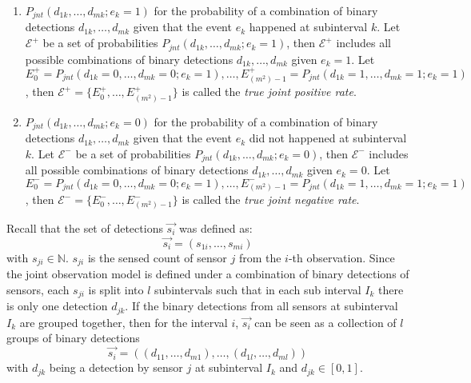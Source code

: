 \begin{enumerate}
    \item $P_{jnt}(d_{1k}, \ldots, d_{mk} ; e_k = 1)$ for the probability of a combination of binary detections $d_{1k}, \ldots, d_{mk}$ given that the event $e_k$ happened at subinterval $k$. Let $\mathcal E^+$ be a set of probabilities $P_{jnt}(d_{1k}, \ldots, d_{mk} ; e_k = 1)$, then $\mathcal E^+$ includes all possible combinations of binary detections $d_{1k}, \ldots, d_{mk}$ given $e_k = 1$. Let $E^+_0 = P_{jnt}(d_{1k} = 0, \ldots, d_{mk} = 0 ; e_k = 1), \ldots, E^+_{(m^2)-1} = P_{jnt}(d_{1k} = 1, \ldots, d_{mk} = 1 ; e_k = 1)$, then $\mathcal E^+ = \big \{ E^+_0, \ldots, E^+_{(m^2)-1} \big \}$ is called the \textit{true joint positive rate}. \\
    \item $P_{jnt}(d_{1k}, \ldots, d_{mk} ; e_k = 0)$ for the probability of a combination of binary detections $d_{1k}, \ldots, d_{mk}$ given that the event $e_k$ did not happened at subinterval $k$. Let $\mathcal E^-$ be a set of probabilities $P_{jnt}(d_{1k}, \ldots, d_{mk} ; e_k = 0)$, then $\mathcal E^-$ includes all possible combinations of binary detections $d_{1k}, \ldots, d_{mk}$ given $e_k = 0$. Let $E^-_0 = P_{jnt}(d_{1k} = 0, \ldots, d_{mk} = 0 ; e_k = 1), \ldots, E^-_{(m^2)-1} = P_{jnt}(d_{1k} = 1, \ldots, d_{mk} = 1 ; e_k = 1)$, then $\mathcal E^- = \big \{ E^-_0, \ldots, E^-_{(m^2)-1} \big \}$ is called the \textit{true joint negative rate}.
\end{enumerate}

Recall that the set of detections $\overrightarrow{s_i}$ was defined as:
\begin{equation*}
    \overrightarrow{s_i} = (s_{1i}, \ldots, s_{mi})
\end{equation*}
with $s_{ji} \in \mathbb N$. $s_{ji}$ is the sensed count of sensor $j$ from the $i$-th observation. Since the joint observation model is defined under a combination of binary detections of sensors, each $s_{ji}$ is split into $l$ subintervals such that in each sub interval $I_k$ there is only one detection $d_{jk}$. If the binary detections from all sensors at subinterval $I_k$ are grouped together, then for the interval $i$, $\overrightarrow{s_i}$ can be seen as a collection of $l$ groups of binary detections
\begin{equation}
    \label{eq:s_i_definition}
    \overrightarrow{s_i} = ((d_{11}, \ldots, d_{m1}), \ldots, (d_{1l}, \ldots, d_{ml}))
\end{equation}
\noindent with $d_{jk}$ being a detection by sensor $j$ at subinterval $I_k$ and $d_{jk} \in [0, 1]$.

